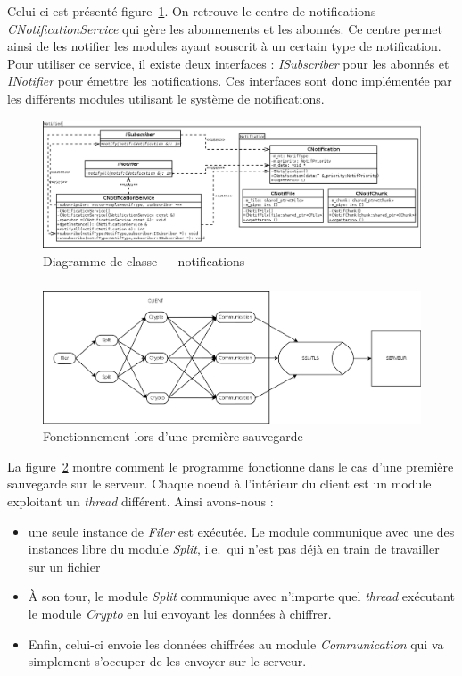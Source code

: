 \documentclass[a4paper,10pt, twoside]{report}
\begin{document}
\begin{spacing}{1.2}
Celui-ci est présenté figure~\ref{classDiagramNotif}. On retrouve le
centre de notifications \textit{CNotificationService} qui gère les
abonnements et les abonnés. Ce centre permet ainsi de les notifier les modules
ayant souscrit à un certain type de notification. Pour utiliser ce service,
il existe deux interfaces : \textit{ISubscriber} pour les abonnés et
\textit{INotifier} pour émettre les notifications. Ces interfaces sont donc
implémentée par les différents modules utilisant le système de
notifications.

\begin{figure}[h!]
  \hspace{-4.5em}
  \includegraphics[width=19cm]{softwareDesign/classDiagramNotif.png}
  \caption{\label{classDiagramNotif} Diagramme de classe --- notifications}
\end{figure}

\subparagraph{}
\begin{figure}[h!]
  \hspace{-1.5em}
  \includegraphics[width=17cm]{softwareDesign/moduleInteraction.png}
  \caption{\label{interactModule} Fonctionnement lors d'une première
  sauvegarde}
\end{figure}

La figure~\ref{interactModule} montre comment le programme fonctionne dans le
cas d'une première sauvegarde sur le serveur. Chaque noeud à l'intérieur
du client est un module exploitant un \textit{thread} différent. Ainsi
avons-nous :
\begin{itemize}
 \item une seule instance de \textit{Filer} est exécutée. Le module
 communique avec une des instances libre du module \textit{Split}, i.e.~qui
 n'est pas déjà en train de travailler sur un fichier
 \item À son tour, le module \textit{Split} communique avec n'importe quel
 \textit{thread} exécutant le module \textit{Crypto} en lui envoyant les
 données à chiffrer.
 \item Enfin, celui-ci envoie les données chiffrées au module
 \textit{Communication} qui va simplement s'occuper de les envoyer sur le
 serveur.
\end{itemize}


\end{spacing}
\end{document}

